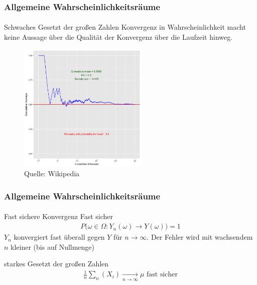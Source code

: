 \documentclass{beamer}
\begin{document}
\begin{frame}
    \frametitle{Allgemeine Wahrscheinlichkeitsräume}
\framesubtitle{}

\begin{block}{Schwaches Gesetzt der großen Zahlen }
Konvergenz in Wahrscheinlichkeit macht keine Aussage über die Qualität der Konvergenz über die Laufzeit hinweg.
\end{block}
\begin{figure}[htp]
      \centering
    \includegraphics[width=0.55\textwidth]{img/lln}
      \caption{Quelle: Wikipedia}
\end{figure}


 \end{frame}


\begin{frame}
    \frametitle{Allgemeine Wahrscheinlichkeitsräume}
\framesubtitle{}

\begin{block}{Fast sichere Konvergenz}
Fast sicher
\begin{align*}
P \bigl  ( \omega \in \Omega : Y_n (\omega)\to Y(\omega) \bigr) = 1
\end{align*}
$Y_n$ konvergiert fast überall gegen $Y$ für $n \to \infty$. Der Fehler wird mit wachsendem $n$ kleiner (bis auf Nullmenge)

\end{block}
\begin{block}{starkes Gesetzt der großen Zahlen }
\begin{align*}
\frac{1}{n} \sum_n (X_i) \underset{n \to \infty}{\longrightarrow} \mu \text { fast sicher}
\end{align*}
\end{block}

 \end{frame}
\end{document}
